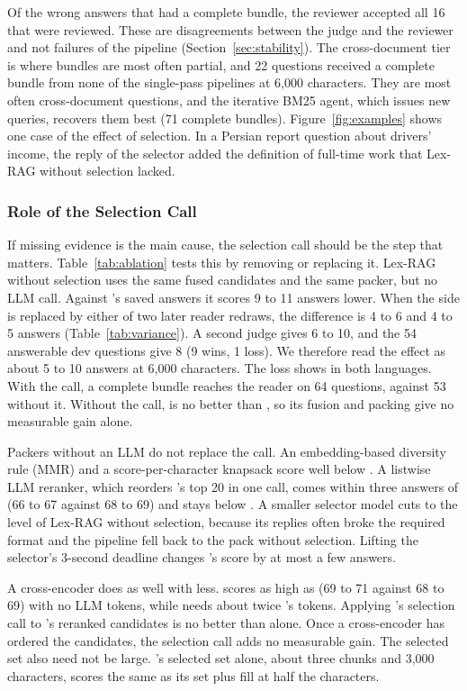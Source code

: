 Of the wrong answers that had a complete bundle, the reviewer accepted all 16 that were reviewed. These are disagreements between the judge and the reviewer and not failures of the pipeline (Section~\ref{sec:stability}). The cross-document tier is where bundles are most often partial, and 22 questions received a complete bundle from none of the single-pass pipelines at 6,000 characters. They are most often cross-document questions, and the iterative BM25 agent, which issues new queries, recovers them best (71 complete bundles). Figure~\ref{fig:examples} shows one case of the effect of selection. In a Persian report question about drivers' income, the reply of the selector added the definition of full-time work that Lex-RAG without selection lacked.

\subsubsection{Role of the Selection Call}

If missing evidence is the main cause, the selection call should be the step that matters. Table~\ref{tab:ablation} tests this by removing or replacing it. Lex-RAG without selection uses the same fused candidates and the same packer, but no LLM call. Against \lexb's saved answers it scores 9 to 11 answers lower. When the \lexb{} side is replaced by either of two later reader redraws, the difference is 4 to 6 and 4 to 5 answers (Table~\ref{tab:variance}). A second judge gives 6 to 10, and the 54 answerable dev questions give 8 (9 wins, 1 loss). We therefore read the effect as about 5 to 10 answers at 6,000 characters. The loss shows in both languages. With the call, a complete bundle reaches the reader on 64 questions, against 53 without it. Without the call, \lexb{} is no better than \hybrid, so its fusion and packing give no measurable gain alone.

Packers without an LLM do not replace the call. An embedding-based diversity rule (MMR) and a score-per-character knapsack score well below \lexb. A listwise LLM reranker, which reorders \hybrid's top 20 in one call, comes within three answers of \lexb{} (66 to 67 against 68 to 69) and stays below \hr. A smaller selector model cuts \lexb{} to the level of Lex-RAG without selection, because its replies often broke the required format and the pipeline fell back to the pack without selection. Lifting the selector's 3-second deadline changes \lexb's score by at most a few answers.

A cross-encoder does as well with less. \hr{} scores as high as \lexb{} (69 to 71 against 68 to 69) with no LLM tokens, while \lexb{} needs about twice \hybrid's tokens. Applying \lexb's selection call to \hr's reranked candidates is no better than \hr{} alone. Once a cross-encoder has ordered the candidates, the selection call adds no measurable gain. The selected set also need not be large. \setr's selected set alone, about three chunks and 3,000 characters, scores the same as its set plus fill at half the characters.

